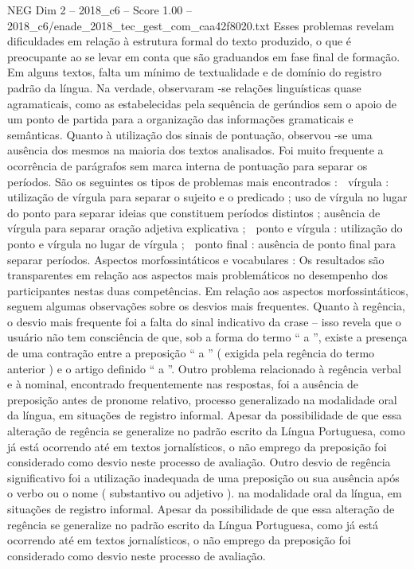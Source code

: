\begin{textsample}{NEG Dim 2 – 2018\_c6 – Score 1.00 – 2018\_c6/enade\_2018\_tec\_gest\_com\_caa42f8020.txt}
Esses problemas revelam dificuldades em relação à estrutura formal do texto produzido, o que é preocupante ao se levar em conta que são graduandos em fase final de formação.
Em alguns textos, falta um mínimo de textualidade e de domínio do registro padrão da língua.
Na verdade, observaram -se relações linguísticas quase agramaticais, como as estabelecidas pela sequência de gerúndios sem o apoio de um ponto de partida para a organização das informações gramaticais e semânticas.
Quanto à utilização dos sinais de pontuação, observou -se uma ausência dos mesmos na maioria dos textos analisados.
Foi muito frequente a ocorrência de parágrafos sem marca interna de pontuação para separar os períodos.
São os seguintes os tipos de problemas mais encontrados :  vírgula : utilização de vírgula para separar o sujeito e o predicado ; uso de vírgula no lugar do ponto para separar ideias que constituem períodos distintos ; ausência de vírgula para separar oração adjetiva explicativa ;  ponto e vírgula : utilização do ponto e vírgula no lugar de vírgula ;  ponto final : ausência de ponto final para separar períodos.
Aspectos morfossintáticos e vocabulares : Os resultados são transparentes em relação aos aspectos mais problemáticos no desempenho dos participantes nestas duas competências.
Em relação aos aspectos morfossintáticos, seguem algumas observações sobre os desvios mais frequentes.
Quanto à regência, o desvio mais frequente foi a falta do sinal indicativo da crase – isso revela que o usuário não tem consciência de que, sob a forma do termo “ a ”, existe a presença de uma contração entre a preposição “ a ” ( exigida pela regência do termo anterior ) e o artigo definido “ a ”.
Outro problema relacionado à regência verbal e à nominal, encontrado frequentemente nas respostas, foi a ausência de preposição antes de pronome relativo, processo generalizado na modalidade oral da língua, em situações de registro informal.
Apesar da possibilidade de que essa alteração de regência se generalize no padrão escrito da Língua Portuguesa, como já está ocorrendo até em textos jornalísticos, o não emprego da preposição foi considerado como desvio neste processo de avaliação.
Outro desvio de regência significativo foi a utilização inadequada de uma preposição ou sua ausência após o verbo ou o nome ( substantivo ou adjetivo ). na modalidade oral da língua, em situações de registro informal.
Apesar da possibilidade de que essa alteração de regência se generalize no padrão escrito da Língua Portuguesa, como já está ocorrendo até em textos jornalísticos, o não emprego da preposição foi considerado como desvio neste processo de avaliação.

\end{textsample}
